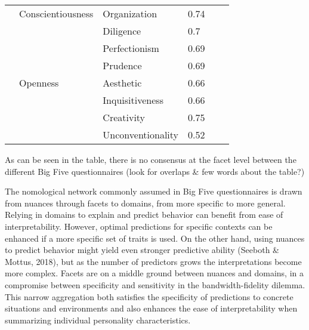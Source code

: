\documentclass[man]{apa6}
\theoremstyle{definition}
\theoremstyle{definition}
\theoremstyle{definition}
\theoremstyle{remark}
\begin{document}
\begin{table}[ht]
\begin{tabular}{llllll}
             & Conscientiousness      & Organization           & 0.74        &          &              \\
             &                        & Diligence              & 0.7         &          &              \\
             &                        & Perfectionism          & 0.69        &          &              \\
             &                        & Prudence               & 0.69        &          &              \\
             & Openness               & Aesthetic              & 0.66        &          &              \\
             &                        & Inquisitiveness        & 0.66        &          &              \\
             &                        & Creativity             & 0.75        &          &              \\
             &                        & Unconventionality      & 0.52        &          &              \\
\end{tabular}
\end{table}

As can be seen in the table, there is no consensus at the facet level
between the different Big Five questionnaires (look for overlaps \& few
words about the table?)

The nomological network commonly assumed in Big Five questionnaires is
drawn from nuances through facets to domains, from more specific to more
general. Relying in domains to explain and predict behavior can benefit
from ease of interpretability. However, optimal predictions for specific
contexts can be enhanced if a more specific set of traits is used. On
the other hand, using nuances to predict behavior might yield even
stronger predictive ability (Seeboth \& Mottus, 2018), but as the number
of predictors grows the interpretations become more complex. Facets are
on a middle ground between nuances and domains, in a compromise between
specificity and sensitivity in the bandwidth-fidelity dilemma. This
narrow aggregation both satisfies the specificity of predictions to
concrete situations and environments and also enhances the ease of
interpretability when summarizing individual personality
characteristics.
\end{document}
